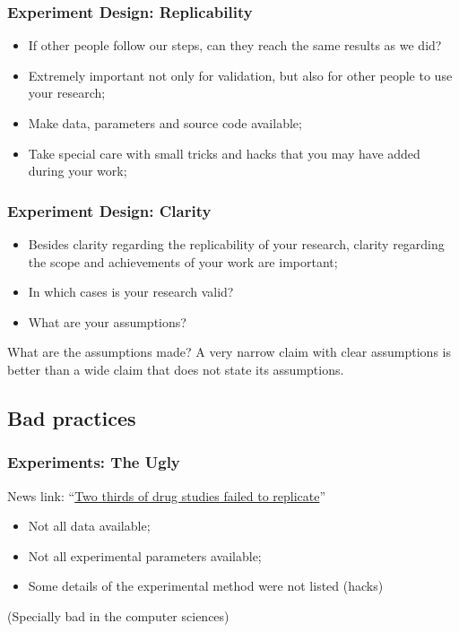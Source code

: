 \documentclass{beamer}
\begin{document}
\begin{frame}
  \frametitle{Experiment Design: Replicability} %
  \begin{itemize}
  \item If other people follow our steps, can they reach the same
    results as we did?
  \item Extremely important not only for validation, but also for
    other people to use your research;
  \item Make data, parameters and source code available;
  \item Take special care with small tricks and hacks that you may
    have added during your work;
  \end{itemize}
\end{frame}

\begin{frame}
  \frametitle{Experiment Design: Clarity} %
  \begin{itemize}
  \item Besides clarity regarding the replicability of your research,
    clarity regarding the scope and achievements of your work are
    important;
  \item In which cases is your research valid?
  \item What are your assumptions?
  \end{itemize}
  \bigskip

  \begin{block}{What are the assumptions made?}
    A very narrow claim with clear assumptions is better than a wide
    claim that does not state its assumptions.
  \end{block}
\end{frame}

\subsection{Bad practices}
\begin{frame}
  \frametitle{Experiments: The Ugly}
  \begin{block}{}
    News link:
    ``\href{http://www.newscientist.com/article/mg21528826.000-is-medical-science-built-on-shaky-foundations.html}{Two
      thirds of drug studies failed to replicate}''
  \end{block}
  \bigskip

  \begin{itemize}
  \item Not all data available;
  \item Not all experimental parameters available;
  \item Some details of the experimental method were not listed
    (hacks)
  \end{itemize}
  \vfill
  \begin{center}
    (Specially bad in the computer sciences)
  \end{center}

\end{frame}
\end{document}
